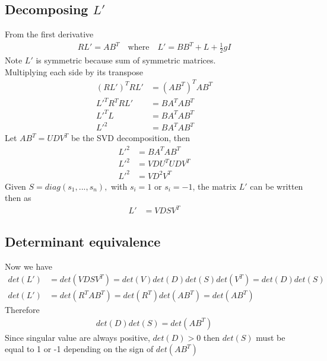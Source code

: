 \documentclass{report}
\begin{document}
\subsection{Decomposing $L'$}
From the first derivative
\begin{align}
RL'=AB^T \quad\text{where}\quad L'=BB^T + L + \frac{1}{2}gI
\end{align}
Note $L'$ is symmetric because sum of symmetric matrices. \\
Multiplying each side by its transpose
\begin{align}
    (RL')^TRL'&=(AB^T)^TAB^T \\
    L'^TR^TRL' &= BA^TAB^T \\
    L'^TL &= BA^TAB^T \\
    L'^2 &= BA^TAB^T
\end{align}
Let $AB^T=UDV^T$ be the SVD decomposition, then
\begin{align}
    L'^2 &= BA^TAB^T \\
    L'^2 &= VDU^TUDV^T \\
    L'^2 &= VD^2V^T 
\end{align}
Given $S=diag(s_1,...,s_n),$ with $s_i=1$ or $s_i=-1$, the matrix $L'$ can be written then as
\begin{align}
    L'&= VDSV^T 
\end{align}


\subsection{Determinant equivalence}
Now we have
\begin{align}
    det(L') &= det(VDSV^T) = det(V)det(D)det(S)det(V^T) = det(D)det(S) \\
    det(L') &= det(R^TAB^T) =det(R^T)det(AB^T) = det(AB^T)
\end{align}
Therefore
\begin{align}
    det(D)det(S) = det(AB^T)
\end{align}
Since singular value are always positive, $det(D) > 0$ then $det(S)$ must be equal to 1 or -1 depending on the sign of $det(AB^T)$
\end{document}
